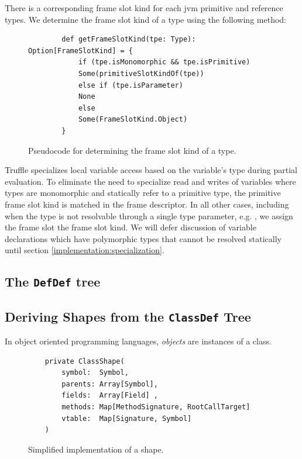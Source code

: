 There is a corresponding frame slot kind for each \acrshort{jvm} primitive and reference types. 
We determine the frame slot kind of a type using the following method:

\begin{figure}[H]
	\begin{verbatim}
		def getFrameSlotKind(tpe: Type): Option[FrameSlotKind] = {
			if (tpe.isMonomorphic && tpe.isPrimitive)
			Some(primitiveSlotKindOf(tpe))
			else if (tpe.isParameter)
			None
			else
			Some(FrameSlotKind.Object)
		}	
	\end{verbatim}
	\caption{Pseudocode for determining the frame slot kind of a type.}
\end{figure}

Truffle specializes local variable access based on the variable's type during partial evaluation\cite{truffle:partial-eval}. 
To eliminate the need to specialize read and writes of variables where types are monomorphic and statically refer to a primitive type, the primitive frame slot kind is matched in the frame descriptor. 
In all other cases, including when the type is not resolvable through a single type parameter, e.g. , we assign the frame slot the  frame slot kind.
We will defer discussion of variable declarations which have polymorphic types that cannot be resolved statically until section \ref{implementation:specialization}.

\subsection{The \texttt{DefDef} tree}
\label{impl:subsection:defdef}

\subsection{Deriving Shapes from the \texttt{ClassDef} Tree}
\label{impl:subsection:classdef}

In object oriented programming languages, \textit{objects} are instances of a class.

\begin{figure}[!htb]
	\begin{verbatim}
	private ClassShape(
		symbol:  Symbol,
		parents: Array[Symbol],
		fields:  Array[Field] ,
		methods: Map[MethodSignature, RootCallTarget]
		vtable:  Map[Signature, Symbol]
	)
	\end{verbatim}
	\caption{Simplified implementation of a shape.}
\end{figure}

